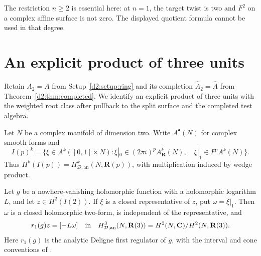 The restriction $n\ge2$ is essential here: at $n=1$, the target
twist is two and $F^2$ on a complex affine surface is not zero.
The displayed quotient formula cannot be used in that degree.

\section{An explicit product of three units}
\label{d2ext:sec-explicit-triple}

Retain $A_2=A$ from Setup~\ref{d2:setup:ring} and its
completion $\widehat A_2=\widehat A$ from Theorem~\ref{d2:thm:completed}.
We identify an explicit product of three units with the weighted
root class after pullback to the split surface and the completed test algebra.

Let $N$ be a complex manifold of dimension two. Write $A^\bullet(N)$
for complex smooth forms and
\[
 I(p)^k=\{\xi\in A^k([0,1]\times N):
 \xi|_0\in (2\pi i)^pA^k_{\mathbf R}(N),\quad
 \xi|_1\in F^pA^k(N)\}.
\]
Thus $H^k(I(p))=H^k_{\mathcal D,\mathrm{an}}(N,\mathbf R(p))$,
with multiplication induced by wedge product.

\begin{lemma}\label{d2ext:interval-product}
Let $g$ be a nowhere-vanishing holomorphic function with a holomorphic
logarithm $L$, and let $z\in H^2(I(2))$. If $\xi$ is a closed
representative of $z$, put $\omega=\xi|_1$. Then $\omega$ is a
closed holomorphic two-form, is independent of the representative,
and
\[
 r_1(g)z=[-L\omega]\quad\hbox{in}\quad
 H^3_{\mathcal D,\mathrm{an}}(N,\mathbf R(3))
 =H^2(N,\mathbf C)/H^2(N,\mathbf R(3)).
\]
Here $r_1(g)$ is the analytic Deligne first regulator of $g$, with
the interval and cone conventions of
\cite[Definition~2.7 and Proposition~2.8]{BunkeTamme}.
\end{lemma}

